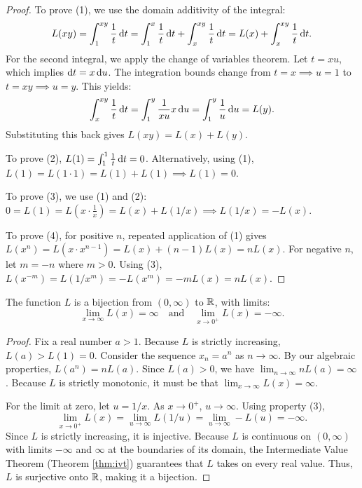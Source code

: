\documentclass[../analysis1.tex]{subfiles}
\begin{document}
\begin{proof}
    To prove (1), we use the domain additivity of the integral:
    \[
        L(xy) = \int_1^{xy} \frac{1}{t} \d{t} = \int_1^x \frac{1}{t} \d{t} + \int_x^{xy} \frac{1}{t} \d{t} = L(x) + \int_x^{xy} \frac{1}{t} \d{t}.
    \]
    For the second integral, we apply the change of variables theorem. Let $t = xu$, which implies $\d{t} = x \d{u}$. The integration bounds change from $t=x \implies u=1$ to $t=xy \implies u=y$. This yields:
    \[
        \int_x^{xy} \frac{1}{t} \d{t} = \int_1^y \frac{1}{xu} x \d{u} = \int_1^y \frac{1}{u} \d{u} = L(y).
    \]
    Substituting this back gives $L(xy) = L(x) + L(y)$.
    
    To prove (2), $L(1) = \int_1^1 \frac{1}{t} \d{t} = 0$. Alternatively, using (1), $L(1) = L(1 \cdot 1) = L(1) + L(1) \implies L(1) = 0$.
    
    To prove (3), we use (1) and (2): $0 = L(1) = L(x \cdot \frac{1}{x}) = L(x) + L(1/x) \implies L(1/x) = -L(x)$.
    
    To prove (4), for positive $n$, repeated application of (1) gives $L(x^n) = L(x \cdot x^{n-1}) = L(x) + (n-1)L(x) = nL(x)$. For negative $n$, let $m = -n$ where $m > 0$. Using (3), $L(x^{-m}) = L(1/x^m) = -L(x^m) = -mL(x) = nL(x)$.\qedhere
\end{proof}

\begin{theorem}
    \begin{shaded*}
        The function $L$ is a bijection from $(0, \infty)$ to $\mathbb{R}$, with limits:
        \[
            \lim_{x \to \infty} L(x) = \infty \quad \text{and} \quad \lim_{x \to 0^+} L(x) = -\infty.
        \]
    \end{shaded*}
\end{theorem}

\begin{proof}
    Fix a real number $a > 1$. Because $L$ is strictly increasing, $L(a) > L(1) = 0$. 
    Consider the sequence $x_n = a^n$ as $n \to \infty$. By our algebraic properties, $L(a^n) = nL(a)$. Since $L(a) > 0$, we have $\lim_{n \to \infty} nL(a) = \infty$. Because $L$ is strictly monotonic, it must be that $\lim_{x \to \infty} L(x) = \infty$.
    
    For the limit at zero, let $u = 1/x$. As $x \to 0^+$, $u \to \infty$. Using property (3), 
    \[
        \lim_{x \to 0^+} L(x) = \lim_{u \to \infty} L(1/u) = \lim_{u \to \infty} -L(u) = -\infty.
    \]
    Since $L$ is strictly increasing, it is injective. Because $L$ is continuous on $(0, \infty)$ with limits $-\infty$ and $\infty$ at the boundaries of its domain, the Intermediate Value Theorem (Theorem \ref{thm:ivt}) guarantees that $L$ takes on every real value. Thus, $L$ is surjective onto $\mathbb{R}$, making it a bijection.\qedhere
\end{proof}
\end{document}
